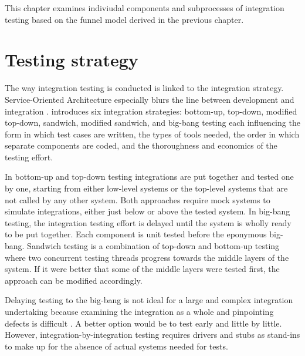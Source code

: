 \documentclass[12pt,a4paper,oneside,pdftex]{report}
\begin{document}
{This chapter examines indiviudal components and subprocesses of integration testing based on the funnel model derived in the previous chapter.

\section{Testing strategy}
The way integration testing is conducted is linked to the integration strategy. Service-Oriented Architecture especially blurs the line between development and integration \citep{huang2008surrogate, wieczorek2010model}. \citet{myers1976software} introduces six integration strategies: bottom-up, top-down, modified top-down, sandwich, modified sandwich, and big-bang testing each influencing the form in which test cases are written, the types of tools needed, the order in which separate components are coded, and the thoroughness and economics of the testing effort. 

In bottom-up and top-down testing integrations are put together and tested one by one, starting from either low-level systems or the top-level systems that are not called by any other system. Both approaches require mock systems to simulate integrations, either just below or above the tested system. In big-bang testing, the integration testing effort is delayed until the system is wholly ready to be put together. Each component is unit tested before the eponymous big-bang. Sandwich testing is a combination of top-down and bottom-up testing where two concurrent testing threads progress towards the middle layers of the system. If it were better that some of the middle layers were tested first, the approach can be modified accordingly. \citep{burnstein2003practical, myers1976software}

\begin{comment} %
Other incremental testing methods include delivery, criticality, or functionality based 
strategies \citep{van2008identifying} where the system connections and hierarchy are built selectively an integration at a time. Further, \citet{carey1977control} discuss build testing. \citet{beizer1984software} introduces a "mixed bag" strategy which combines bottom-up, top-down, big-bang and build testing. 
\end{comment}

Delaying testing to the big-bang is not ideal for a large and complex integration undertaking because examining the integration as a whole and pinpointing defects is difficult \citep{myers1976software}. A better option would be to test early and little by little. However, integration-by-integration testing requires drivers and stubs as stand-ins to make up for the absence of actual systems needed for tests. 

}
\end{document}
